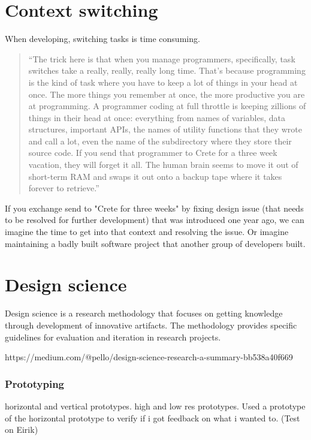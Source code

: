 \documentclass{report}
\begin{document}
\section{Context switching}
When developing, switching tasks is time consuming. 

\begin{quote}
    ``The trick here is that when you manage programmers, specifically, task switches take a really, really, really long time. That’s because programming is the kind of task where you have to keep a lot of things in your head at once. The more things you remember at once, the more productive you are at programming. A programmer coding at full throttle is keeping zillions of things in their head at once: everything from names of variables, data structures, important APIs, the names of utility functions that they wrote and call a lot, even the name of the subdirectory where they store their source code. If you send that programmer to Crete for a three week vacation, they will forget it all. The human brain seems to move it out of short-term RAM and swaps it out onto a backup tape where it takes forever to retrieve.'' \cite{human-context-switching}
\end{quote} 
If you exchange send to "Crete for three weeks" by fixing design issue (that needs to be resolved for further development) that was introduced one year ago, we can imagine the time to get into that context and resolving the issue. Or imagine maintaining a badly built software project that another group of developers built.


\section{Design science}
Design science is a research methodology that focuses on getting knowledge through development of innovative artifacts. The methodology provides specific guidelines for evaluation and iteration in research projects.

https://medium.com/@pello/design-science-research-a-summary-bb538a40f669

\subsubsection{Prototyping}

horizontal and vertical prototypes. high and low res prototypes.
Used a prototype of the horizontal prototype to verify if i got feedback on what i wanted to. (Test on Eirik) 
\end{document}
